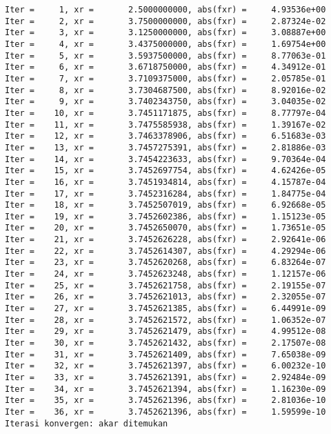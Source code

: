 \documentclass[11pt]{article}
\begin{document}
    \begin{Verbatim}[commandchars=\\\{\}]
Iter =     1, xr =       2.5000000000, abs(fxr) =     4.93536e+00
Iter =     2, xr =       3.7500000000, abs(fxr) =     2.87324e-02
Iter =     3, xr =       3.1250000000, abs(fxr) =     3.08887e+00
Iter =     4, xr =       3.4375000000, abs(fxr) =     1.69754e+00
Iter =     5, xr =       3.5937500000, abs(fxr) =     8.77063e-01
Iter =     6, xr =       3.6718750000, abs(fxr) =     4.34912e-01
Iter =     7, xr =       3.7109375000, abs(fxr) =     2.05785e-01
Iter =     8, xr =       3.7304687500, abs(fxr) =     8.92016e-02
Iter =     9, xr =       3.7402343750, abs(fxr) =     3.04035e-02
Iter =    10, xr =       3.7451171875, abs(fxr) =     8.77797e-04
Iter =    11, xr =       3.7475585938, abs(fxr) =     1.39167e-02
Iter =    12, xr =       3.7463378906, abs(fxr) =     6.51683e-03
Iter =    13, xr =       3.7457275391, abs(fxr) =     2.81886e-03
Iter =    14, xr =       3.7454223633, abs(fxr) =     9.70364e-04
Iter =    15, xr =       3.7452697754, abs(fxr) =     4.62426e-05
Iter =    16, xr =       3.7451934814, abs(fxr) =     4.15787e-04
Iter =    17, xr =       3.7452316284, abs(fxr) =     1.84775e-04
Iter =    18, xr =       3.7452507019, abs(fxr) =     6.92668e-05
Iter =    19, xr =       3.7452602386, abs(fxr) =     1.15123e-05
Iter =    20, xr =       3.7452650070, abs(fxr) =     1.73651e-05
Iter =    21, xr =       3.7452626228, abs(fxr) =     2.92641e-06
Iter =    22, xr =       3.7452614307, abs(fxr) =     4.29294e-06
Iter =    23, xr =       3.7452620268, abs(fxr) =     6.83264e-07
Iter =    24, xr =       3.7452623248, abs(fxr) =     1.12157e-06
Iter =    25, xr =       3.7452621758, abs(fxr) =     2.19155e-07
Iter =    26, xr =       3.7452621013, abs(fxr) =     2.32055e-07
Iter =    27, xr =       3.7452621385, abs(fxr) =     6.44991e-09
Iter =    28, xr =       3.7452621572, abs(fxr) =     1.06352e-07
Iter =    29, xr =       3.7452621479, abs(fxr) =     4.99512e-08
Iter =    30, xr =       3.7452621432, abs(fxr) =     2.17507e-08
Iter =    31, xr =       3.7452621409, abs(fxr) =     7.65038e-09
Iter =    32, xr =       3.7452621397, abs(fxr) =     6.00232e-10
Iter =    33, xr =       3.7452621391, abs(fxr) =     2.92484e-09
Iter =    34, xr =       3.7452621394, abs(fxr) =     1.16230e-09
Iter =    35, xr =       3.7452621396, abs(fxr) =     2.81036e-10
Iter =    36, xr =       3.7452621396, abs(fxr) =     1.59599e-10
Iterasi konvergen: akar ditemukan
    \end{Verbatim}
\end{document}
